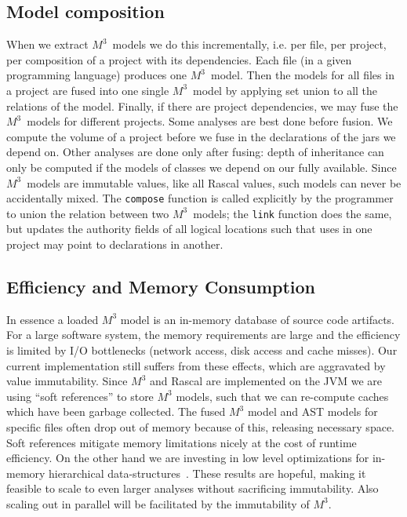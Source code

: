 \documentclass[conference]{IEEEtran}
\newcommand{\mthree}{\ensuremath{M^3}\xspace}
\begin{document}
\subsection{Model composition} When we extract \mthree\  models we do this
incrementally, i.e. per file, per project, per composition of a project with
its dependencies. Each file (in a given programming language) produces one
\mthree\  model. Then the models for all files in a project are fused into one
single \mthree\  model by applying set union to all the relations of the
model. Finally, if there are project dependencies, we may fuse the \mthree\
models for different projects.
%
Some analyses are best done before fusion. We compute the volume of a project
before we fuse in the declarations of the jars we depend on. Other analyses
are done only after fusing: depth of inheritance can only be computed if the
models of classes we depend on our fully available. Since \mthree\  models are
immutable values, like all Rascal values, such models can never be accidentally
mixed. The \texttt{compose} function is called
explicitly by the programmer to union the relation between two \mthree\ models;
the \texttt{link} function does the same, but updates the authority fields
of all logical locations such that uses in one project may point to
declarations in another.


\subsection{Efficiency and Memory Consumption}

In essence a loaded \mthree model is an in-memory database of source code
artifacts. For a large software system, the memory requirements are large and the
efficiency is limited by I/O bottlenecks (network access, disk access and
cache misses). Our current implementation still suffers from these effects,
which are aggravated by value immutability.
%
Since \mthree and Rascal are implemented on the JVM we are using ``soft
references'' to store \mthree models, such that we can re-compute caches which
have been garbage collected. The fused \mthree model and AST models for
specific files often drop out of memory because of this, releasing necessary
space. Soft references mitigate memory limitations nicely at the cost of
runtime efficiency.
%
On the other hand we are investing in low level optimizations for in-memory
hierarchical data-structures~\cite{BJKO00,gpce}. These results are hopeful,
making it feasible to scale to even larger analyses without sacrificing
immutability. Also scaling out in parallel will be facilitated by the immutability of \mthree.
\end{document}
